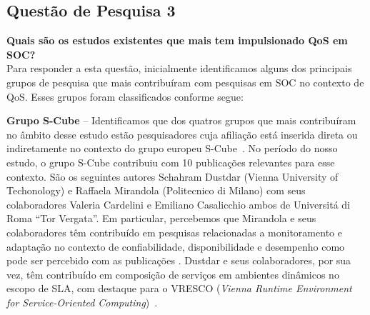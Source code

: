 \subsection{Questão de Pesquisa 3}\label{sec:QP3}

\textbf{Quais s\~{a}o os estudos existentes que mais tem impulsionado QoS em SOC?}
\\[0.01in]


Para responder a esta quest\~{a}o, inicialmente identificamos alguns dos principais grupos de pesquisa que mais contribu\'{i}ram com pesquisas em SOC no contexto de QoS. Esses grupos foram classificados conforme segue: 

\textbf{Grupo S-Cube} -- Identificamos que dos quatros grupos que mais contribu\'{i}ram no \^{a}mbito desse estudo est\~{a}o pesquisadores cuja afilia\c{c}\~{a}o est\'{a} inserida direta ou indiretamente no contexto do grupo europeu S-Cube~\cite{SCube-FINALREPORT}. No per\'{i}odo do nosso estudo, o grupo S-Cube contribuiu com 10 publica\c{c}\~{o}es relevantes para esse contexto. S\~{a}o os seguintes autores Schahram Dustdar (Vienna University of Techonology) e Raffaela Mirandola (Politecnico di Milano) com seus colaboradores Valeria Cardelini e Emiliano Casalicchio ambos de Universit\'{a} di Roma ``Tor Vergata''. Em particular, percebemos que Mirandola e seus colaboradores t\^{e}m contribu\'{i}do em pesquisas relacionadas a monitoramento e adapta\c{c}\~{a}o no contexto de confiabilidade, disponibilidade e desempenho como pode ser percebido com as publica\c{c}\~{o}es \cite{Cardellini:2009:QRA:1595696.1595718, Calinescu:2011:DQM:1990772.1991012, Ardagna:2010:POS:1814581.1814611, 10.1109/TSE.2011.68, Cardellini:
2009:TSD:1692867.1692870}. Dustdar e seus colaboradores, por sua vez, t\^{e}m contribu\'{i}do em composi\c{c}\~{a}o de servi\c{c}os em ambientes din\^{a}micos no escopo de SLA, com destaque para o  VRESCO (\emph{Vienna Runtime Environment for Service-Oriented Computing})~\cite{5467022}. 


